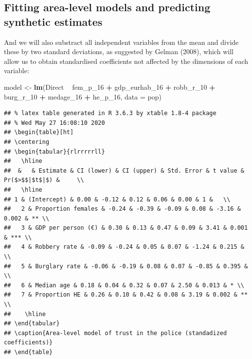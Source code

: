 \documentclass[
]{article}
\newenvironment{Shaded}{\begin{snugshade}}{\end{snugshade}}
\newcommand{\DataTypeTok}[1]{\textcolor[rgb]{0.13,0.29,0.53}{#1}}
\newcommand{\DecValTok}[1]{\textcolor[rgb]{0.00,0.00,0.81}{#1}}
\newcommand{\KeywordTok}[1]{\textcolor[rgb]{0.13,0.29,0.53}{\textbf{#1}}}
\newcommand{\NormalTok}[1]{#1}
\newcommand{\OperatorTok}[1]{\textcolor[rgb]{0.81,0.36,0.00}{\textbf{#1}}}
\newcommand{\StringTok}[1]{\textcolor[rgb]{0.31,0.60,0.02}{#1}}
\begin{document}
\hypertarget{fitting-area-level-models-and-predicting-synthetic-estimates}{%
\subsection{Fitting area-level models and predicting synthetic
estimates}\label{fitting-area-level-models-and-predicting-synthetic-estimates}}

And we will also substract all independent variables from the mean and
divide these by two standard deviations, as suggested by Gelman (2008),
which will allow us to obtain standardised coefficients not affected by
the dimensions of each variable:

\begin{Shaded}
\begin{Highlighting}[]
\NormalTok{model <-}\StringTok{ }\KeywordTok{lm}\NormalTok{(Direct }\OperatorTok{~}\StringTok{  }\NormalTok{fem_p_}\DecValTok{16}  \OperatorTok{+}\StringTok{ }\NormalTok{gdp_eurhab_}\DecValTok{16} \OperatorTok{+}\StringTok{ }\NormalTok{robb_r_}\DecValTok{10} \OperatorTok{+}\StringTok{ }
\StringTok{                      }\NormalTok{burg_r_}\DecValTok{10} \OperatorTok{+}\StringTok{  }\NormalTok{medage_}\DecValTok{16}    \OperatorTok{+}\StringTok{ }\NormalTok{he_p_}\DecValTok{16}\NormalTok{, }
            \DataTypeTok{data =}\NormalTok{ pop)}
\end{Highlighting}
\end{Shaded}

\begin{verbatim}
## % latex table generated in R 3.6.3 by xtable 1.8-4 package
## % Wed May 27 16:08:10 2020
## \begin{table}[ht]
## \centering
## \begin{tabular}{rlrrrrrll}
##   \hline
##  &   & Estimate & CI (lower) & CI (upper) & Std. Error & t value & Pr($>$$|$t$|$) &     \\ 
##   \hline
## 1 & (Intercept) & 0.00 & -0.12 & 0.12 & 0.06 & 0.00 & 1 &   \\ 
##   2 & Proportion females & -0.24 & -0.39 & -0.09 & 0.08 & -3.16 & 0.002 & ** \\ 
##   3 & GDP per person (€) & 0.30 & 0.13 & 0.47 & 0.09 & 3.41 & 0.001 & *** \\ 
##   4 & Robbery rate & -0.09 & -0.24 & 0.05 & 0.07 & -1.24 & 0.215 &   \\ 
##   5 & Burglary rate & -0.06 & -0.19 & 0.08 & 0.07 & -0.85 & 0.395 &   \\ 
##   6 & Median age & 0.18 & 0.04 & 0.32 & 0.07 & 2.50 & 0.013 & * \\ 
##   7 & Proportion HE & 0.26 & 0.10 & 0.42 & 0.08 & 3.19 & 0.002 & ** \\ 
##    \hline
## \end{tabular}
## \caption{Area-level model of trust in the police (standadized coefficients)} 
## \end{table}
\end{verbatim}
\end{document}
